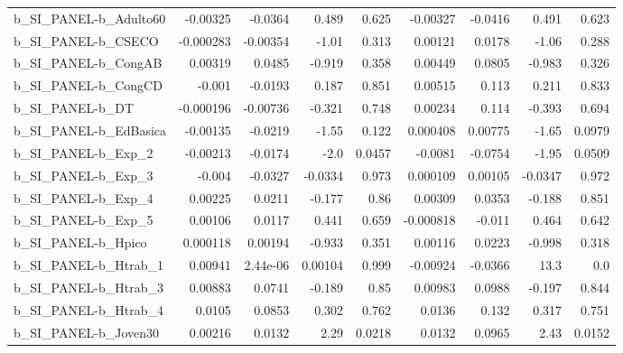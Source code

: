 \begin{tabular}{lrrrrrrrr}
b\_SI\_PANEL-b\_Adulto60      &    -0.00325 &      -0.0364 &    0.489 &    0.625 &   -0.00327 &     -0.0416 &        0.491 &         0.623 \\
b\_SI\_PANEL-b\_CSECO         &   -0.000283 &     -0.00354 &    -1.01 &    0.313 &    0.00121 &      0.0178 &        -1.06 &         0.288 \\
b\_SI\_PANEL-b\_CongAB        &     0.00319 &       0.0485 &   -0.919 &    0.358 &    0.00449 &      0.0805 &       -0.983 &         0.326 \\
b\_SI\_PANEL-b\_CongCD        &      -0.001 &      -0.0193 &    0.187 &    0.851 &    0.00515 &       0.113 &        0.211 &         0.833 \\
b\_SI\_PANEL-b\_DT            &   -0.000196 &     -0.00736 &   -0.321 &    0.748 &    0.00234 &       0.114 &       -0.393 &         0.694 \\
b\_SI\_PANEL-b\_EdBasica      &    -0.00135 &      -0.0219 &    -1.55 &    0.122 &   0.000408 &     0.00775 &        -1.65 &        0.0979 \\
b\_SI\_PANEL-b\_Exp\_2         &    -0.00213 &      -0.0174 &     -2.0 &   0.0457 &    -0.0081 &     -0.0754 &        -1.95 &        0.0509 \\
b\_SI\_PANEL-b\_Exp\_3         &      -0.004 &      -0.0327 &  -0.0334 &    0.973 &   0.000109 &     0.00105 &      -0.0347 &         0.972 \\
b\_SI\_PANEL-b\_Exp\_4         &     0.00225 &       0.0211 &   -0.177 &     0.86 &    0.00309 &      0.0353 &       -0.188 &         0.851 \\
b\_SI\_PANEL-b\_Exp\_5         &     0.00106 &       0.0117 &    0.441 &    0.659 &  -0.000818 &      -0.011 &        0.464 &         0.642 \\
b\_SI\_PANEL-b\_Hpico         &    0.000118 &      0.00194 &   -0.933 &    0.351 &    0.00116 &      0.0223 &       -0.998 &         0.318 \\
b\_SI\_PANEL-b\_Htrab\_1       &     0.00941 &     2.44e-06 &  0.00104 &    0.999 &   -0.00924 &     -0.0366 &         13.3 &           0.0 \\
b\_SI\_PANEL-b\_Htrab\_3       &     0.00883 &       0.0741 &   -0.189 &     0.85 &    0.00983 &      0.0988 &       -0.197 &         0.844 \\
b\_SI\_PANEL-b\_Htrab\_4       &      0.0105 &       0.0853 &    0.302 &    0.762 &     0.0136 &       0.132 &        0.317 &         0.751 \\
b\_SI\_PANEL-b\_Joven30       &     0.00216 &       0.0132 &     2.29 &   0.0218 &     0.0132 &      0.0965 &         2.43 &        0.0152 \\

\end{tabular}
